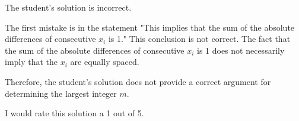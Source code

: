 The student's solution is incorrect.

The first mistake is in the statement "This implies that the sum of the absolute differences of consecutive \(x_i\) is 1." This conclusion is not correct. The fact that the sum of the absolute differences of consecutive \(x_i\) is 1 does not necessarily imply that the \(x_i\) are equally spaced.

Therefore, the student's solution does not provide a correct argument for determining the largest integer \(m\). 

I would rate this solution a 1 out of 5.
